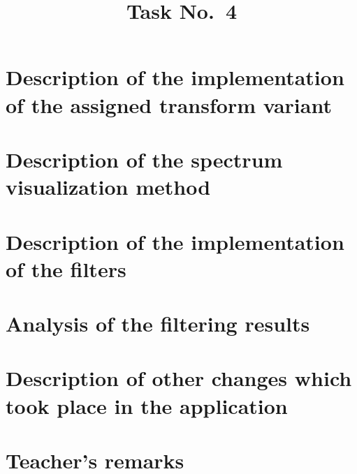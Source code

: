 \documentclass[12pt]{article}
\title{Task No.~4}
\begin{document}
\maketitle

\section{Description of the implementation of the assigned transform variant}

\section{Description of the spectrum visualization method}

\section{Description of the implementation of the filters}

\section{Analysis of the filtering results}

\section{Description of other changes which took place in the application}

\vfill
\section*{Teacher's remarks}
\begin{tabularx}{\textwidth}{|X|}
    \hline
    \vspace{7cm}
    \phantom{.} \\
    \hline
\end{tabularx}
\end{document}
